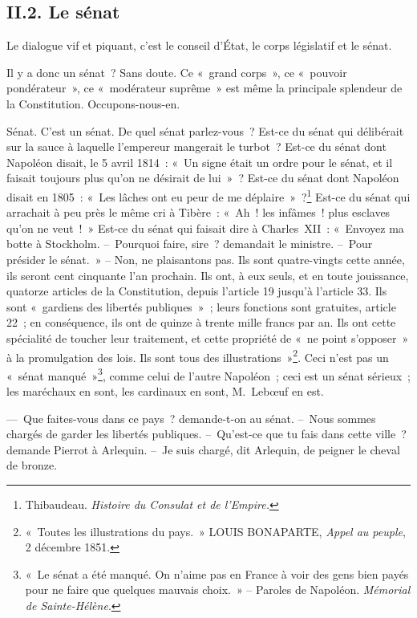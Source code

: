 \documentclass[french,twoside]{book} %
\begin{document}
\subsection[{II.2. Le sénat}]{II.2. Le sénat}
\noindent Le dialogue vif et piquant, c’est le conseil d’État, le corps législatif et le sénat.\par
Il y a donc un sénat ? Sans doute. Ce « grand corps », ce « pouvoir pondérateur », ce « modérateur suprême » est même la principale splendeur de la Constitution. Occupons-nous-en.\par
Sénat. C’est un sénat. De quel sénat parlez-vous ? Est-ce du sénat qui délibérait sur la sauce à laquelle l’empereur mangerait le turbot ? Est-ce du sénat dont Napoléon disait, le 5 avril 1814 : « Un signe était un ordre pour le sénat, et il faisait toujours plus qu’on ne désirait de lui » ? Est-ce du sénat dont Napoléon disait en 1805 : « Les lâches ont eu peur de me déplaire » ?\footnote{Thibaudeau. \emph{Histoire du Consulat et de l’Empire.}} Est-ce du sénat qui arrachait à peu près le même cri à Tibère : « Ah ! les infâmes ! plus esclaves qu’on ne veut ! » Est-ce du sénat qui faisait dire à Charles XII : « Envoyez ma botte à Stockholm. – Pourquoi faire, sire ? demandait le ministre. – Pour présider le sénat. » – Non, ne plaisantons pas. Ils sont quatre-vingts cette année, ils seront cent cinquante l’an prochain. Ils ont, à eux seuls, et en toute jouissance, quatorze articles de la Constitution, depuis l’article 19 jusqu’à l’article 33. Ils sont « gardiens des libertés publiques » ; leurs fonctions sont gratuites, article 22 ; en conséquence, ils ont de quinze à trente mille francs par an. Ils ont cette spécialité de toucher leur traitement, et cette propriété de « ne point s’opposer » à la promulgation des lois. Ils sont tous des illustrations »\footnote{« Toutes les illustrations du pays. » LOUIS BONAPARTE, \emph{Appel au peuple}, 2 décembre 1851.}. Ceci n’est pas un « sénat manqué »\footnote{« Le sénat a été manqué. On n’aime pas en France à voir des gens bien payés pour ne faire que quelques mauvais choix. » – Paroles de Napoléon. \emph{Mémorial de Sainte-Hélène}.}, comme celui de l’autre Napoléon ; ceci est un sénat sérieux ; les maréchaux en sont, les cardinaux en sont, M. Lebœuf en est.\par
— Que faites-vous dans ce pays ? demande-t-on au sénat. – Nous sommes chargés de garder les libertés publiques. – Qu’est-ce que tu fais dans cette ville ? demande Pierrot à Arlequin. – Je suis chargé, dit Arlequin, de peigner le cheval de bronze.\par
\end{document}

